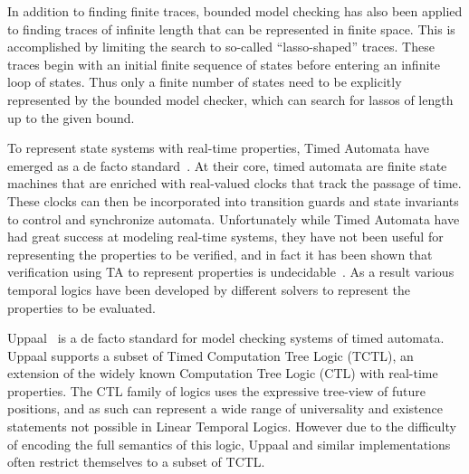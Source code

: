 \documentclass[a4paper,11pt]{report}
\theoremstyle{definition}
\begin{document}
In addition to finding finite traces, bounded model checking has also been
applied to finding traces of infinite length that can be represented in finite
space. This is accomplished by limiting the search to so-called ``lasso-shaped''
traces. These traces begin with an initial finite sequence of states before
entering an infinite loop of states. Thus only a finite number of states need to
be explicitly represented by the bounded model checker, which can search for
lassos of length up to the given bound.

To represent state systems with real-time properties, Timed Automata have
emerged as a de facto standard~\cite{alur94}. At their core, timed automata are
finite state machines that are enriched with real-valued clocks that track the
passage of time. These clocks can then be incorporated into transition guards
and state invariants to control and synchronize automata. Unfortunately while
Timed Automata have had great success at modeling real-time systems, they have
not been useful for representing the properties to be verified, and in fact it
has been shown that verification using TA to represent properties is
undecidable~\cite{alur94}. As a result various temporal logics have been
developed by different solvers to represent the properties to be evaluated.

Uppaal~\cite{larsen97} is a de facto standard for model checking systems of timed
automata. Uppaal supports a subset of Timed Computation Tree Logic (TCTL), an
extension of the widely known Computation Tree Logic (CTL) with real-time
properties. The CTL family of logics uses the expressive tree-view of future
positions, and as such can represent a wide range of universality and existence
statements not possible in Linear Temporal Logics. However due to the difficulty
of encoding the full semantics of this logic, Uppaal and similar implementations
often restrict themselves to a subset of TCTL.
\end{document}
